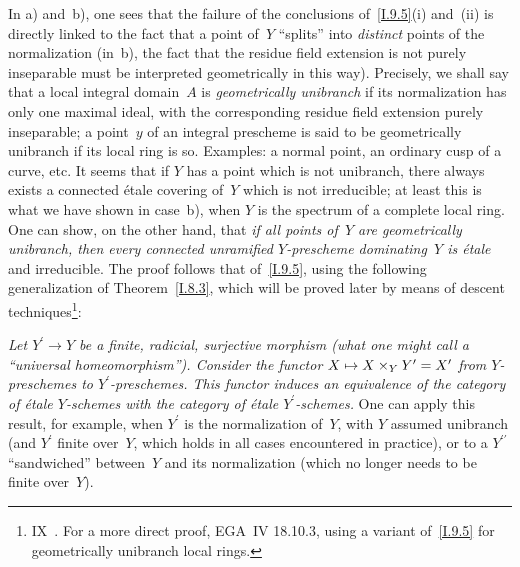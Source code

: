 In a) and~b), one sees that the failure of the
conclusions of~\ref{I.9.5}\ptbl (i) and~(ii) is
directly linked to the fact that a point of~$Y$
``splits'' into \emph{distinct} points of the
normalization (in~b), the fact that the residue
field extension is not purely inseparable must
be interpreted geometrically in this way).
Precisely, we shall say that a local integral
domain~$A$ is \emph{geometrically unibranch} if
its normalization has only one maximal ideal,
with the corresponding residue field extension
purely inseparable; a point~$y$ of an integral
prescheme is said to be geometrically unibranch
if its local ring is so. Examples: a normal point,
an ordinary cusp of a curve, etc. It seems that
if $Y$ has a point which
is not unibranch, there always exists a connected
\'etale covering of~$Y$ which is not irreducible;
at least this is what we have shown in case~b),
when $Y$ is the spectrum of a complete local ring.
One can show, on the other hand, that \emph{if
all points of~$Y$ are geometrically unibranch,
then every connected unramified $Y$-prescheme
dominating~$Y$ is \'etale} and irreducible.
The proof follows that of~\ref{I.9.5}, using the
following generalization of Theorem~\ref{I.8.3},
which will be proved later by means of descent
techniques\footnote{\Cf IX~.
For a more direct proof, \cf EGA~IV 18.10.3,
using a variant of~\ref{I.9.5} for geometrically
unibranch local rings.}:

\emph{Let $Y^\prime\to Y$ be a finite, radicial,
surjective morphism (\ie what one might call
a ``universal homeomorphism''). Consider the
functor $X\mto X\times_Y Y^\prime=X^\prime$ from
$Y$-preschemes to $Y^\prime$-preschemes. This
functor induces an equivalence of the category
of \'etale $Y$-schemes with the category of
\'etale $Y^\prime$-schemes.} One can apply this
result, for example, when $Y^\prime$ is the
normalization of~$Y$, with $Y$ assumed unibranch
(and $Y^\prime$ finite over~$Y$, which holds in
all cases encountered in practice), or to a
$Y^{\prime\prime}$ ``sandwiched'' between~$Y$
and its normalization (which no longer needs
to be finite over~$Y$).
